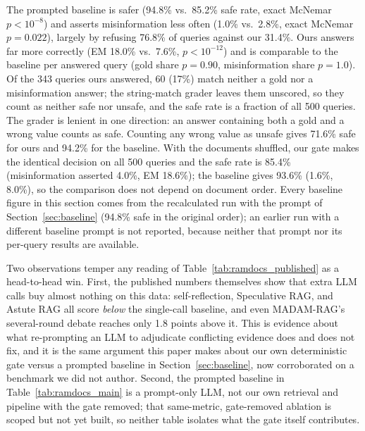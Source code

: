 \documentclass[conference]{IEEEtran}
\begin{document}
The prompted baseline is safer (94.8\% vs.\ 85.2\% safe rate, exact McNemar
$p<10^{-8}$) and asserts misinformation less often (1.0\% vs.\ 2.8\%,
exact McNemar $p=0.022$), largely by refusing 76.8\% of queries against our 31.4\%. Ours
answers far more correctly (EM 18.0\% vs.\ 7.6\%, $p<10^{-12}$) and is
comparable to the baseline per answered query (gold share $p=0.90$,
misinformation share $p=1.0$). Of the 343 queries ours answered, 60 (17\%)
match neither a gold nor a misinformation answer; the string-match grader
leaves them unscored, so they count as neither safe nor unsafe, and the
safe rate is a fraction of all 500 queries. The grader is lenient in one
direction: an answer containing both a gold and a wrong value counts as
safe. Counting any wrong value as unsafe gives 71.6\% safe for ours and
94.2\% for the baseline. With the documents shuffled, our gate makes the
identical decision on all 500 queries and the safe rate is 85.4\%
(misinformation asserted 4.0\%, EM 18.6\%); the baseline gives 93.6\%
(1.6\%, 8.0\%), so the comparison does not depend on document order.
Every baseline figure in this section comes from the recalculated run with
the prompt of Section~\ref{sec:baseline} (94.8\% safe in the original
order); an earlier run with a different baseline prompt is not reported,
because neither that prompt nor its per-query results are available.

Two observations temper any reading of Table~\ref{tab:ramdocs_published} as a
head-to-head win. First, the published numbers themselves show that extra
LLM calls buy almost nothing on this data: self-reflection, Speculative
RAG, and Astute RAG all score \textit{below} the single-call baseline, and
even MADAM-RAG's several-round debate reaches only 1.8 points above it.
This is evidence about what re-prompting an LLM to adjudicate conflicting
evidence does and does not fix, and it is the same argument this paper
makes about our own deterministic gate versus a prompted baseline in
Section~\ref{sec:baseline}, now corroborated on a benchmark we did not
author. Second, the prompted baseline in Table~\ref{tab:ramdocs_main} is a
prompt-only LLM, not our own retrieval and pipeline with the gate removed;
that same-metric, gate-removed ablation is scoped but not yet built, so
neither table isolates what the gate itself contributes.
\end{document}

